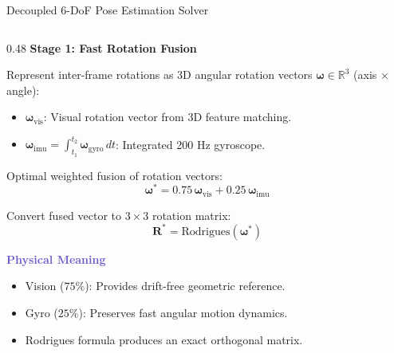 \documentclass[aspectratio=169, 10pt]{beamer}
\begin{document}
\begin{frame}{Decoupled 6-DoF Pose Estimation Solver}
  \begin{columns}[T]
    \begin{column}{0.48\textwidth}
      {\small \textbf{\textcolor{NavyBlue}{Stage 1: Fast Rotation Fusion}}}
      \vspace{0.06cm}

      \scriptsize
      Represent inter-frame rotations as 3D angular rotation vectors $\boldsymbol{\omega} \in \mathbb{R}^3$ (axis $\times$ angle):
      \begin{itemize}
        \setlength{\itemsep}{2pt}
        \item $\boldsymbol{\omega}_{\text{vis}}$: Visual rotation vector from 3D feature matching.
        \item $\boldsymbol{\omega}_{\text{imu}} = \int_{t_1}^{t_2} \boldsymbol{\omega}_{\text{gyro}} \, dt$: Integrated 200 Hz gyroscope.
      \end{itemize}

      \vspace{0.06cm}
      Optimal weighted fusion of rotation vectors:
      \begin{equation}
        \boldsymbol{\omega}^* = 0.75 \, \boldsymbol{\omega}_{\text{vis}} + 0.25 \, \boldsymbol{\omega}_{\text{imu}}
      \end{equation}

      Convert fused vector to $3 \times 3$ rotation matrix:
      \begin{equation}
        \mathbf{R}^* = \text{Rodrigues}(\boldsymbol{\omega}^*)
      \end{equation}

      \vspace{0.04cm}
      {\small \textbf{\textcolor{SlateBlue}{Physical Meaning}}}\\
      \scriptsize
      \begin{itemize}
        \setlength{\itemsep}{1.5pt}
        \item Vision ($75\%$): Provides drift-free geometric reference.
        \item Gyro ($25\%$): Preserves fast angular motion dynamics.
        \item Rodrigues formula produces an exact orthogonal matrix.
      \end{itemize}
    \end{column}


\end{columns}
\end{frame}
\end{document}
